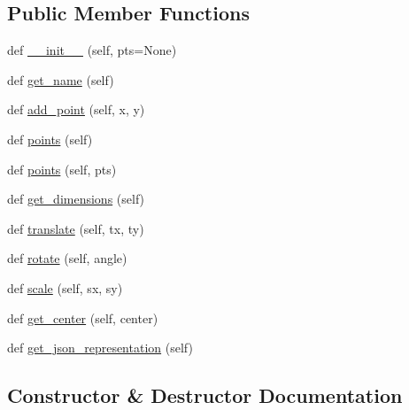 \subsection*{Public Member Functions}
\begin{DoxyCompactItemize}
\item 
def \mbox{\hyperlink{classbridges_1_1polyline_1_1_polyline_a536cf599bc221283c8e8d6df2324f23e}{\+\_\+\+\_\+init\+\_\+\+\_\+}} (self, pts=None)
\item 
def \mbox{\hyperlink{classbridges_1_1polyline_1_1_polyline_ac29d5a9cfe5fd60d97a32adef3a6b6bc}{get\+\_\+name}} (self)
\item 
def \mbox{\hyperlink{classbridges_1_1polyline_1_1_polyline_a0afbd2327d8dcba63809a6be07704753}{add\+\_\+point}} (self, x, y)
\item 
def \mbox{\hyperlink{classbridges_1_1polyline_1_1_polyline_ad1671a5857ad9e4010b7783b472c83fa}{points}} (self)
\item 
def \mbox{\hyperlink{classbridges_1_1polyline_1_1_polyline_ad543fcb38cb561b71d2ae2a9a88d9888}{points}} (self, pts)
\item 
def \mbox{\hyperlink{classbridges_1_1polyline_1_1_polyline_abc460c0169e1251e572642f8e968df05}{get\+\_\+dimensions}} (self)
\item 
def \mbox{\hyperlink{classbridges_1_1polyline_1_1_polyline_a654226c0de86aa0c6b9b5181a552cbfe}{translate}} (self, tx, ty)
\item 
def \mbox{\hyperlink{classbridges_1_1polyline_1_1_polyline_ab72d0a3cfdc4c3a7efec194f54f8a14a}{rotate}} (self, angle)
\item 
def \mbox{\hyperlink{classbridges_1_1polyline_1_1_polyline_a2727d3d6fa9da5ea738c51f822da16ae}{scale}} (self, sx, sy)
\item 
def \mbox{\hyperlink{classbridges_1_1polyline_1_1_polyline_a381cd78da11db3ce98fa87acd1d57449}{get\+\_\+center}} (self, center)
\item 
def \mbox{\hyperlink{classbridges_1_1polyline_1_1_polyline_a7f99e9e20c90068713b54ad64df3f193}{get\+\_\+json\+\_\+representation}} (self)
\end{DoxyCompactItemize}


\subsection{Constructor \& Destructor Documentation}
\mbox{\label{classbridges_1_1polyline_1_1_polyline_a536cf599bc221283c8e8d6df2324f23e}} 
